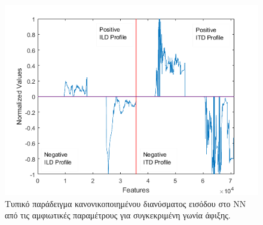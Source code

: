 \begin{figure}[h]
  \centering
  \includegraphics[width=\textwidth]{images/final_profile.png}
  \caption{Τυπικό παράδειγμα κανονικοποιημένου διανύσματος εισόδου στο ΝΝ από τις αμφιωτικές παραμέτρους για συγκεκριμένη γωνία άφιξης.}
  \label{fig:final_profile}
\end{figure}
